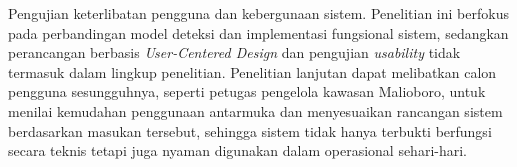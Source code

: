 Pengujian keterlibatan pengguna dan kebergunaan sistem. Penelitian ini berfokus pada 
perbandingan model deteksi dan implementasi fungsional sistem, sedangkan perancangan 
berbasis \textit{User-Centered Design} dan pengujian \textit{usability} tidak termasuk 
dalam lingkup penelitian. Penelitian lanjutan dapat melibatkan calon pengguna sesungguhnya, 
seperti petugas pengelola kawasan Malioboro, untuk menilai kemudahan penggunaan antarmuka 
dan menyesuaikan rancangan sistem berdasarkan masukan tersebut, sehingga sistem tidak 
hanya terbukti berfungsi secara teknis tetapi juga nyaman digunakan dalam operasional 
sehari-hari.
